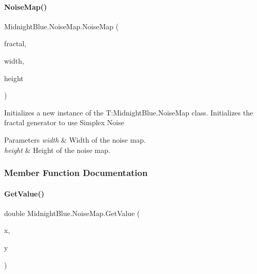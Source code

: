 \paragraph{\texorpdfstring{Noise\+Map()}{NoiseMap()}\hspace{0.1cm}{\footnotesize\ttfamily [2/2]}}
{\footnotesize\ttfamily Midnight\+Blue.\+Noise\+Map.\+Noise\+Map (\begin{DoxyParamCaption}\item[{Implicit\+Module\+Base}]{fractal,  }\item[{int}]{width,  }\item[{int}]{height }\end{DoxyParamCaption})\hspace{0.3cm}{\ttfamily [inline]}}



Initializes a new instance of the T\+:\+Midnight\+Blue.\+Noise\+Map class. Initializes the fractal generator to use Simplex Noise 


\begin{DoxyParams}{Parameters}
{\em width} & Width of the noise map.\\
\hline
{\em height} & Height of the noise map.\\
\hline
\end{DoxyParams}


\subsubsection{Member Function Documentation}
\hypertarget{class_midnight_blue_1_1_noise_map_a70d9e8d99e157143eb3d1dbc3895cb9a}{}\label{class_midnight_blue_1_1_noise_map_a70d9e8d99e157143eb3d1dbc3895cb9a} 
\paragraph{\texorpdfstring{Get\+Value()}{GetValue()}}
{\footnotesize\ttfamily double Midnight\+Blue.\+Noise\+Map.\+Get\+Value (\begin{DoxyParamCaption}\item[{int}]{x,  }\item[{int}]{y }\end{DoxyParamCaption})\hspace{0.3cm}{\ttfamily [inline]}}



